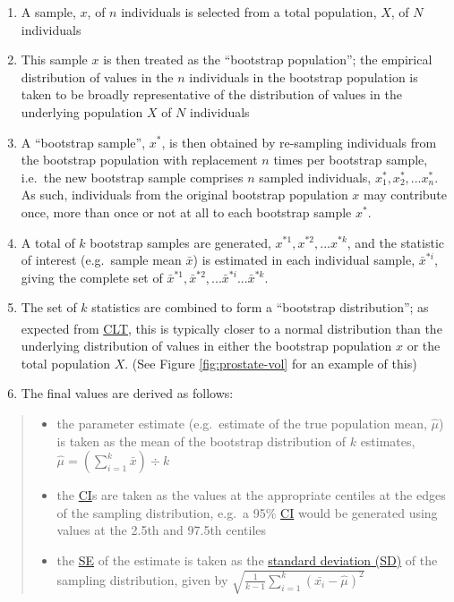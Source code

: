 \documentclass[
]{article}
\providecommand{\tightlist}{%
  \setlength{\itemsep}{0pt}\setlength{\parskip}{0pt}}
\begin{document}
\begin{enumerate}
\def\labelenumi{\arabic{enumi}.}
\tightlist
\item
  A sample, \(x\), of \(n\) individuals is selected from a total population, \(X\), of \(N\) individuals
\item
  This sample \(x\) is then treated as the ``bootstrap population''; the empirical distribution of values in the \(n\) individuals in the bootstrap population is taken to be broadly representative of the distribution of values in the underlying population \(X\) of \(N\) individuals
\item
  A ``bootstrap sample'', \(x^*\), is then obtained by re-sampling individuals from the bootstrap population with replacement \(n\) times per bootstrap sample, i.e.~the new bootstrap sample comprises \(n\) sampled individuals, \(x^*_1, x^*_2,...x^*_n\). As such, individuals from the original bootstrap population \(x\) may contribute once, more than once or not at all to each bootstrap sample \(x^*\).
\item
  A total of \(k\) bootstrap samples are generated, \(x^{*1}, x^{*2},...x^{*k}\), and the statistic of interest (e.g.~sample mean \(\bar{x}\)) is estimated in each individual sample, \(\bar{x}^{*i}\), giving the complete set of \(\bar{x}^{*1}, \bar{x}^{*2},...\bar{x}^{*i}...\bar{x}^{*k}\).
\item
  The set of \(k\) statistics are combined to form a ``bootstrap distribution''; as expected from \hyperref[acronyms_CLT]{CLT}\textsuperscript{}, this is typically closer to a normal distribution than the underlying distribution of values in either the bootstrap population \(x\) or the total population \(X\). (See Figure \ref{fig:prostate-vol} for an example of this)
\item
  The final values are derived as follows:
\end{enumerate}

\begin{quote}
\begin{itemize}
\tightlist
\item
  the parameter estimate (e.g.~estimate of the true population mean, \(\hat{\mu}\)) is taken as the mean of the bootstrap distribution of \(k\) estimates, \(\hat{\mu} = (\sum^k_{i = 1} \bar{x}) \div k\)
\item
  the \hyperref[acronyms_CI]{CI}s are taken as the values at the appropriate centiles at the edges of the sampling distribution, e.g.~a 95\% \hyperref[acronyms_CI]{CI} would be generated using values at the 2.5th and 97.5th centiles
\item
  the \hyperref[acronyms_SE]{SE} of the estimate is taken as the \hyperref[acronyms_SD]{standard deviation (SD)} of the sampling distribution, given by \(\sqrt{\frac{1}{k - 1} \sum^k_{i = 1} (\bar{x_i} - \hat{\mu})^2}\)
\end{itemize}
\end{quote}
\end{document}
